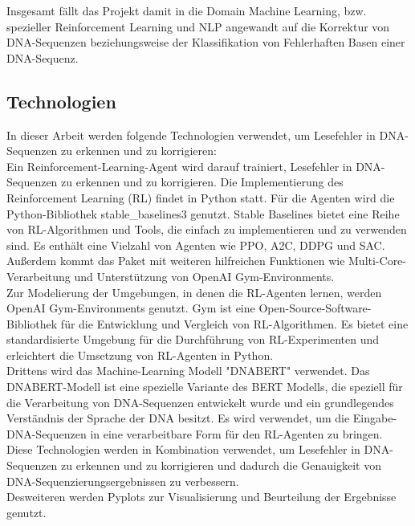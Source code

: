 \documentclass[oneside,bibliography=totocnumbered,BCOR=5mm]{scrbook}%
\theoremstyle{definition}
\theoremstyle{definition}
\theoremstyle{definition}
\theoremstyle{definition}
\theoremstyle{definition}
\theoremstyle{definition}
\begin{document}
Insgesamt fällt das Projekt damit in die Domain Machine Learning, bzw. spezieller Reinforcement Learning und NLP angewandt 
auf die Korrektur von DNA-Sequenzen beziehungsweise der Klassifikation von Fehlerhaften Basen einer DNA-Sequenz.\\
\linebreak[4]


\subsection{Technologien}
In dieser Arbeit werden folgende Technologien verwendet, 
um Lesefehler in DNA-Sequenzen zu erkennen und zu korrigieren:\\


Ein Reinforcement-Learning-Agent wird darauf trainiert, Lesefehler in DNA-Sequenzen zu erkennen und zu korrigieren. 
Die Implementierung des Reinforcement Learning (RL) findet in Python statt. 
Für die Agenten wird die Python-Bibliothek stable\_baselines3 genutzt. 
Stable Baselines bietet eine Reihe von RL-Algorithmen und Tools, die einfach zu implementieren und zu verwenden sind. 
Es enthält eine Vielzahl von Agenten wie PPO, A2C, DDPG und SAC. 
Außerdem kommt das Paket mit weiteren hilfreichen Funktionen wie Multi-Core-Verarbeitung und
Unterstützung von OpenAI Gym-Environments. \\

Zur Modelierung der Umgebungen, in denen die RL-Agenten lernen, werden OpenAI Gym-Environments genutzt. 
Gym ist eine Open-Source-Software-Bibliothek für die Entwicklung und Vergleich von RL-Algorithmen. 
Es bietet eine standardisierte Umgebung für die Durchführung von RL-Experimenten und 
erleichtert die Umsetzung von RL-Agenten in Python. \\


Drittens wird das Machine-Learning Modell "DNABERT" verwendet.
Das DNABERT-Modell ist eine spezielle Variante des BERT Modells, 
die speziell für die Verarbeitung von DNA-Sequenzen entwickelt wurde und 
ein grundlegendes Verständnis der Sprache der DNA besitzt. 
Es wird verwendet, um die Eingabe-DNA-Sequenzen in eine verarbeitbare Form für den RL-Agenten zu bringen.
Diese Technologien werden in Kombination verwendet, um Lesefehler in DNA-Sequenzen zu erkennen und zu korrigieren 
und dadurch die Genauigkeit von DNA-Sequenzierungsergebnissen zu verbessern. \\

Desweiteren werden Pyplots zur Visualisierung und Beurteilung der Ergebnisse genutzt. \\ 
\linebreak[4]
\end{document}
